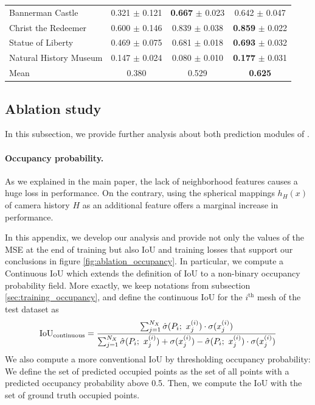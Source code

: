 \begin{table}
{\begin{tabular}{@{}lccc@{}}
     Bannerman Castle & 0.321 $\pm$ 0.121 & \textbf{0.667} $\pm$ 0.023 & 0.642 $\pm$ 0.047 \\
     Christ the Redeemer & 0.600 $\pm$ 0.146 & 0.839 $\pm$ 0.038 & \textbf{0.859} $\pm$ 0.022 \\
     Statue of Liberty & 0.469 $\pm$ 0.075 & 0.681 $\pm$ 0.018 & \textbf{0.693} $\pm$ 0.032 \\
     Natural History Museum & 0.147 $\pm$ 0.024 & 0.080 $\pm$ 0.010 & \textbf{0.177} $\pm$ 0.031 \\
     \midrule
     Mean & 0.380 & 0.529 & \textbf{0.625} \\
  \end{tabular}
  }
\end{table}

\subsection{Ablation study}
In this subsection, we provide further analysis about both prediction modules of \method.

\paragraph{Occupancy probability.}
As we explained in the main paper, the lack of neighborhood features causes a huge loss in performance. On the contrary, using the spherical mappings $h_H(x)$ of camera history $H$ as an additional feature offers a marginal increase in performance.

In this appendix, we develop our analysis and provide not only the values of the MSE at the end of training but also IoU and training losses that support our conclusions in figure \ref{fig:ablation_occupancy}. In particular, we compute a Continuous IoU which extends the definition of IoU to a non-binary occupancy probability field. More exactly, we keep notations from subsection \ref{sec:training_occupancy}, and define the continuous IoU for the $i^{\text{th}}$ mesh of the test dataset as
\begin{equation}
    \text{IoU}_{\text{continuous}} = \frac{
    \sum_{j=1}^{N_X} \hat{\sigma}(P_i;\ x_j^{(i)}) \cdot \sigma(x_j^{(i)})
    }{
    \sum_{j=1}^{N_X} \hat{\sigma}(P_i;\ x_j^{(i)}) + \sigma(x_j^{(i)}) - 
    \hat{\sigma}(P_i;\ x_j^{(i)}) \cdot \sigma(x_j^{(i)})
    }
\end{equation}
We also compute a more conventional IoU by thresholding occupancy probability: We define the set of predicted occupied points as the set of all points with a predicted occupancy probability above 0.5. Then, we compute the IoU with the set of ground truth occupied points.

